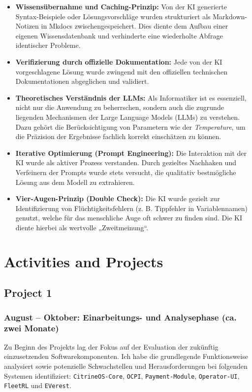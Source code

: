 \documentclass[12pt,a4paper]{report}
\begin{document}
    \begin{itemize} 
        \item \textbf{Wissensübernahme und Caching-Prinzip:} Von der KI generierte Syntax-Beispiele oder Lösungsvorschläge wurden strukturiert als Markdown-Notizen in Mkdocs zwischengespeichert. Dies diente dem Aufbau einer eigenen Wissensdatenbank und verhinderte eine wiederholte Abfrage identischer Probleme. 
        \item \textbf{Verifizierung durch offizielle Dokumentation:} Jede von der KI vorgeschlagene Lösung wurde zwingend mit den offiziellen technischen Dokumentationen abgeglichen und validiert. 
        \item \textbf{Theoretisches Verständnis der LLMs:} Als Informatiker ist es essenziell, nicht nur die Anwendung zu beherrschen, sondern auch die zugrunde liegenden Mechanismen der Large Language Models (LLMs) zu verstehen. Dazu gehört die Berücksichtigung von Parametern wie der \textit{Temperature}, um die Präzision der Ergebnisse fachlich korrekt einschätzen zu können. 
        \item \textbf{Iterative Optimierung (Prompt Engineering):} Die Interaktion mit der KI wurde als aktiver Prozess verstanden. Durch gezieltes Nachhaken und Verfeinern der Prompts wurde stets versucht, die qualitativ bestmögliche Lösung aus dem Modell zu extrahieren. 
        \item \textbf{Vier-Augen-Prinzip (Double Check):} Die KI wurde gezielt zur Identifizierung von Flüchtigkeitsfehlern (z. B. Tippfehler in Variablennamen) genutzt, welche für das menschliche Auge oft schwer zu finden sind. Die KI diente hierbei als wertvolle „Zweitmeinung“. 
    \end{itemize}

\chapter{Activities and Projects}

\section{Project 1}

\subsection{August -- Oktober: Einarbeitungs- und Analysephase (ca. zwei Monate)} 
Zu Beginn des Projekts lag der Fokus auf der Evaluation der zukünftig einzusetzenden Softwarekomponenten. 
Ich habe die grundlegende Funktionsweise analysiert sowie potenzielle Schwachstellen und Herausforderungen bei folgenden Systemen identifiziert: 
\texttt{CitrineOS-Core}, \texttt{OCPI}, \texttt{Payment-Module}, \texttt{Operator-UI}, \texttt{FleetRL} und \texttt{EVerest}.
\end{document}
